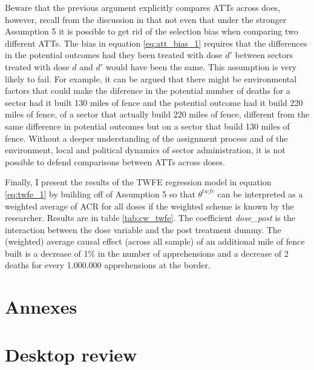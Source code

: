 \documentclass[titlepage]{article}
\theoremstyle{plain}
\theoremstyle{plain}
\begin{document}
Beware that the previous argument explicitly compares ATTs across does, however, recall from the discussion in \cite{callaway2021differenceindifferences} that not even that under the stronger Assumption 5 it is possible to get rid of the selection bias when comparing two different ATTs. The bias in equation \ref{eq:att_bias_1} requires that the differences in the potential outcomes had they been treated with dose $d'$ between sectors treated with dose $d$ and $d'$ would have been the same. This assumption is very likely to fail. For example, it can be argued that there might be environmental factors that could make the diference in the potential number of deaths for a sector had it built 130 miles of fence and the potential outcome had it build 220 miles of fence, of a sector that actually build 220 miles of fence, different from the same difference in potential outcomes but on a sector that build 130 miles of fence. Without a deeper understanding of the assignment process and of the environment, local and political dynamics of sector administration, it is not possible to defend comparisons between ATTs across doses.

Finally, I present the results of the TWFE regression model in equation \ref{eq:twfe_1} by building off of Assumption 5 so that $\theta^{twfe}$ can be interpreted as a weighted average of ACR for all doses if the weighted scheme is known by the researcher. Results are in table \ref{tab:cw_twfe}. The coefficient \textit{dose\_post} is the interaction between the dose variable and the post treatment dummy. The (weighted) average causal effect (across all sample) of an additional mile of fence built is a decrease of 1\% in the number of apprehensions and a decrease of 2 deaths for every 1.000.000 apprehensions at the border.



\newpage
\printbibliography[
heading=bibintoc,
title={References}]


\appendix
{}
\section*{Annexes}

\section{Desktop review}
\end{document}
